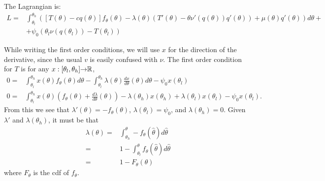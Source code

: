 The Lagrangian is:
\begin{align*}
  L = & \int_{\theta_l}^{\theta_h} \left(  \left[T(\theta) - cq(\theta)\right]
  f_\theta(\theta) - \lambda(\theta) \left(T'(\theta) - \theta \nu'(q(\theta))
        q'(\theta) \right) + \mu(\theta) q'(\theta) \right) d\theta + \\
  & + \psi_0 \left( \theta_l \nu\left(q(\theta_l)\right) - T(\theta_l) \right)
\end{align*}

While writing the first order conditions, we will use $x$ for the
direction of the derivative, since the usual $v$ is easily confused
with $\nu$. The first order condition for $T$ is for any
$x:[\theta_l,\theta_h] {\rightarrow} \mathbb{R}$,
\begin{align*}
  0 = &\int_{\theta_l}^{\theta_h} x(\theta) f_\theta(\theta)
  d\theta - \int_{\theta_l}^{\theta_h} \lambda(\theta)
  \frac{dx}{d\theta}(\theta) d\theta - \psi_0 x(\theta_l)  \\
  0 = & \int_{\theta_l}^{\theta_h} x(\theta)\left( f_\theta(\theta) +
    \frac{d\lambda}{d \theta}(\theta)\right) - \lambda(\theta_h)x(\theta_h) +
  \lambda(\theta_l)x(\theta_l) - \psi_0 x(\theta_l).
\end{align*}
From this we see that $\lambda'(\theta) = -f_\theta(\theta)$,
$\lambda(\theta_l) = \psi_0$, and $\lambda(\theta_h) = 0$. Given $\lambda'$ and
$\lambda(\theta_h)$, it must be that
\begin{align*}
  \lambda(\theta) = & \int_{\theta_h}^\theta -f_\theta(\hat{\theta}) d\hat{\theta} \\
  = & 1 - \int_{\theta_l}^\theta f_{\theta}(\hat{\theta})d\hat{\theta}
  \\
  = & 1 - F_\theta(\theta) 
\end{align*}
where $F_\theta$ is the cdf of $f_\theta$.


